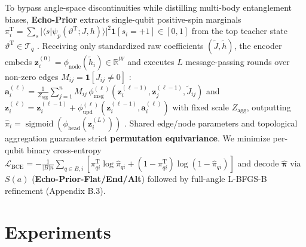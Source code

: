 \documentclass{article}
\theoremstyle{plain}
\theoremstyle{definition}
\begin{document}
To bypass angle-space discontinuities while distilling multi-body entanglement biases, \textbf{Echo-Prior} extracts single-qubit positive-spin marginals $\pi_i^{\mathrm T}=\sum_{s}|\langle s|\psi_p(\vartheta^{\mathrm T};J,h)\rangle|^2\mathbf1[s_i=+1]\in[0,1]$ from the top teacher state $\vartheta^{\mathrm T}\in\mathcal T_q$ \citep{hinton2015distilling}. Receiving only standardized raw coefficients $(\tilde J,\tilde h)$, the encoder embeds $\boldsymbol z_i^{(0)}=\phi_{\mathrm{node}}(\tilde h_i)\in\mathbb R^W$ and executes $L$ message-passing rounds over non-zero edges $M_{ij}=\mathbf1[J_{ij}\ne 0]$ \citep{gilmer2017neural,xu2019how}: $\boldsymbol a_i^{(\ell)}=\frac{1}{Z_{\mathrm{agg}}}\sum_{j=1}^n M_{ij}\,\phi_{\mathrm{msg}}^{(\ell)}(\boldsymbol z_i^{(\ell-1)},\boldsymbol z_j^{(\ell-1)},\tilde J_{ij})$ and $\boldsymbol z_i^{(\ell)}=\boldsymbol z_i^{(\ell-1)}+\phi_{\mathrm{upd}}^{(\ell)}(\boldsymbol z_i^{(\ell-1)},\boldsymbol a_i^{(\ell)})$ with fixed scale $Z_{\mathrm{agg}}$, outputting $\widehat\pi_i=\operatorname{sigmoid}(\phi_{\mathrm{head}}(\boldsymbol z_i^{(L)}))$ \citep{karalias2020erdos,schuetz2022combinatorial}. Shared edge/node parameters and topological aggregation guarantee strict \textbf{permutation equivariance}. We minimize per-qubit binary cross-entropy $\mathcal L_{\mathrm{BCE}}=-\frac{1}{|B|n}\sum_{q\in B,i}[\pi_{qi}^{\mathrm T}\log\widehat\pi_{qi}+(1-\pi_{qi}^{\mathrm T})\log(1-\widehat\pi_{qi})]$ and decode $\widehat{\boldsymbol{\pi}}$ via $S(a)$ (\textbf{Echo-Prior-Flat/End/Alt}) followed by full-angle L-BFGS-B refinement (Appendix B.3).

\section{Experiments}\label{sec:5}
\end{document}

